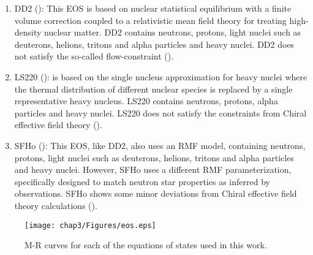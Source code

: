 \begin{enumerate}
\item{DD2 (\citet*{hempel:2011mk}): This EOS is based on nuclear statistical equilibrium with a finite volume correction coupled to a relativistic mean field theory for treating high-density nuclear matter. DD2 contains neutrons, protons, light nuclei such as deuterons, helions, tritons and alpha particles and heavy nuclei. DD2 does not satisfy the so-called flow-constraint (\citet*{hempel2017well}).}
\item{
LS220 (\citet*{lattimer1991generalized}): is based on the single nucleus approximation
for heavy nuclei where the thermal distribution of different nuclear species is replaced by a single representative heavy nucleus. LS220 contains  neutrons, protons, alpha particles and heavy nuclei. LS220 does not satisfy the constraints from Chiral effective field theory (\citet*{hempel2017well}).
}
\item{SFHo (\citet*{2013apj...765l...5s}): This EOS, like DD2, also uses an RMF model, containing neutrons, protons, light nuclei such as deuterons, helions, tritons and alpha particles and heavy nuclei. However, SFHo uses a different RMF parameterization,
specifically designed to match neutron star properties as inferred by observations. SFHo shows some minor
deviations from Chiral effective field theory calculations (\citet*{hempel2017well}).
}
\end{enumerate}

\begin{figure}[H]
  \centering
  \texttt{[image: chap3/Figures/eos.eps]}
\caption{
  M-R curves for each of the equations of states used in this work.
}
\label{fig:eos_mr}
\end{figure}

